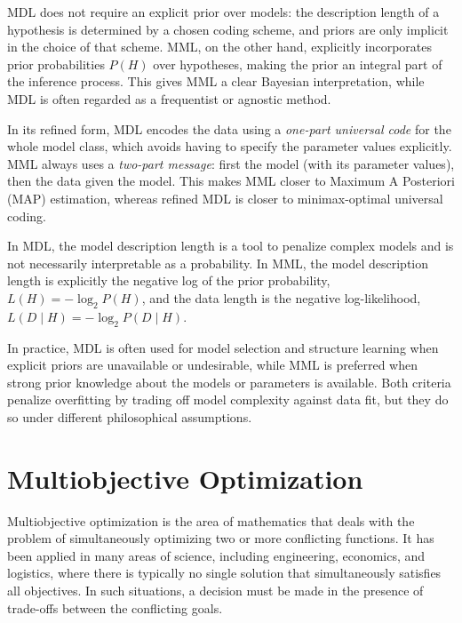 MDL does not require an explicit prior over models: the description length of a hypothesis is determined by a chosen coding scheme, and priors are only implicit in the choice of that scheme. MML, on the other hand, explicitly incorporates prior probabilities $P(H)$ over hypotheses, making the prior an integral part of the inference process. 
This gives MML a clear Bayesian interpretation, while MDL is often regarded as a frequentist or agnostic method.

In its refined form, MDL encodes the data using a \emph{one-part universal code} for the whole model class, which avoids having to specify the parameter values explicitly. MML always uses a \emph{two-part message}: first the model (with its parameter values), then the data given the model. 
This makes MML closer to Maximum A Posteriori (MAP) estimation, whereas refined MDL is closer to minimax-optimal universal coding.

In MDL, the model description length is a tool to penalize complex models and is not necessarily interpretable as a probability. In MML, the model description length is explicitly the negative log of the prior probability, $L(H) = -\log_2 P(H)$, and the data length is the negative log-likelihood, $L(D\mid H) = -\log_2 P(D\mid H)$.

In practice, MDL is often used for model selection and structure learning when explicit priors are unavailable or undesirable, while MML is preferred when strong prior knowledge about the models or parameters is available. 
Both criteria penalize overfitting by trading off model complexity against data fit, but they do so under different philosophical assumptions.

%
%

\section{Multiobjective Optimization}
\label{sec:multiobjective_optimization}

Multiobjective optimization is the area of mathematics that deals with the problem of simultaneously optimizing two or more conflicting functions. It has been applied in many areas of science, including engineering, economics, and logistics, where there is typically no single solution that simultaneously satisfies all objectives. In such situations, a decision must be made in the presence of trade-offs between the conflicting goals.

